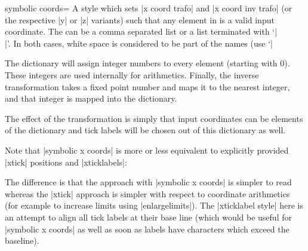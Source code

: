\begin{pgfplotsxykeylist}{symbolic \x\space coords=}
    A style which sets |x coord trafo| and |x coord inv trafo| (or the
    respective |y| or |z| variants) such that any element in 
    is a valid input coordinate. The  can be a comma separated
    list or a list terminated with `|\\|'. In both cases, white space is
    considered to be part of the names (use `|%

    The dictionary will assign integer numbers to every element (starting with
    $0$). These integers are used internally for arithmetics. Finally, the
    inverse transformation takes a fixed point number and maps it to the
    nearest integer, and that integer is mapped into the dictionary.
\begin{codeexample}[]
\end{codeexample}

    The effect of the transformation is simply that input coordinates can be
    elements of the dictionary and tick labels will be chosen out of this
    dictionary as well.

    Note that |symbolic x coords| is more or less equivalent to explicitly
    provided |xtick| positions and |xticklabels|:
\begin{codeexample}[]
\end{codeexample}
    \noindent The difference is that the approach with |symbolic x coords| is
    simpler to read whereas the |xtick| approach is simpler with respect to
    coordinate arithmetics (for example to increase limits using
    |enlargelimits|). The |xticklabel style| here is an attempt to align all
    tick labels at their base line (which would be useful for
    |symbolic x coords| as well as soon as labels have characters which exceed
    the baseline).


\end{pgfplotsxykeylist}
